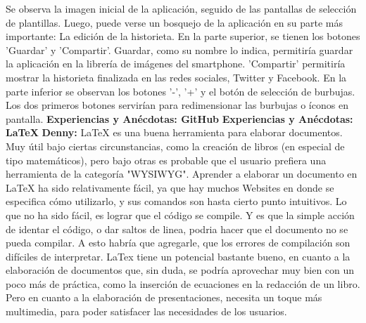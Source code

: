 \documentclass[12pt]{report}
\begin{document}
Se observa la imagen inicial de la aplicación, seguido de las pantallas de selección de plantillas. Luego, puede verse un bosquejo de la aplicación en su parte más importante: La edición de la historieta.
 \newline
 \newline
En la parte superior, se tienen los botones 'Guardar' y 'Compartir'. Guardar, como su nombre lo indica, permitiría guardar la aplicación en la librería de imágenes del smartphone. 'Compartir' permitiría mostrar la historieta finalizada en las redes sociales, Twitter y Facebook.
 \newline
 \newline
En la parte inferior se observan los botones '-', '+' y el botón de selección de burbujas. Los dos primeros botones servirían para redimensionar las burbujas o íconos en pantalla.
           \newline
           \newline
	\begingroup
		\large{
			\textbf{
			           \newline
			           \newline
				Experiencias y Anécdotas: GitHub
				\newline
				\newline
			}
		}
	\endgroup
	\newline
	\newline	
	\begingroup
		\large{
			\textbf{
				Experiencias y Anécdotas: LaTeX
				\newline
				\newline
			}
		}
	\endgroup
	\textbf{Denny:\newline\newline} LaTeX es una buena herramienta para elaborar documentos. Muy útil bajo ciertas circunstancias, como la creación de libros (en especial de tipo matemáticos), pero bajo otras es probable que el usuario prefiera una herramienta de la categoría "WYSIWYG".
\newline
\newline
Aprender a elaborar un documento en LaTeX ha sido relativamente fácil, ya que hay muchos Websites en donde se especifica cómo utilizarlo, y sus comandos son hasta cierto punto intuitivos. Lo que no ha sido fácil, es lograr que el código se compile. Y es que la simple acción de identar el código, o dar saltos de linea,  podria hacer que el documento no se pueda compilar. A esto habría que agregarle, que los errores de compilación son difíciles de interpretar. 
\newline
\newline
LaTex tiene un potencial bastante bueno, en cuanto a la elaboración de documentos que, sin duda, se podría aprovechar muy bien con un poco más de práctica, como la inserción de ecuaciones en la redacción de un libro. Pero en cuanto a la elaboración de presentaciones, necesita un toque más multimedia, para poder satisfacer las necesidades de los usuarios.
\newline
\newline
\end{document}
